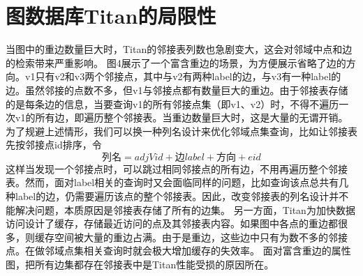 \section{图数据库Titan的局限性}
当图中的重边数量巨大时，Titan的邻接表列数也急剧变大，这会对邻域中点和边的检索带来严重影响。
图4展示了一个富含重边的场景，为方便展示省略了边的方向。v1只有v2和v3两个邻接点，其中与v2有两种label的边，与v3有一种label的边。虽然邻接的点数不多，但v1与邻接点都有数量巨大的重边。由于邻接表存储的是每条边的信息，当要查询v1的所有邻接点集（即v1、v2）时，不得不遍历一次v1的所有边，即遍历整个邻接表。当重边数量巨大时，这是大量的无谓开销。
为了规避上述情形，我们可以换一种列名设计来优化邻域点集查询，比如让邻接表先按邻接点id排序，令
$$列名 = adjVid + 边label + 方向 + eid$$
这样当发现一个邻接点时，可以跳过相同邻接点的所有边，不用再遍历整个邻接表。然而，面对label相关的查询时又会面临同样的问题，比如查询该点总共有几种label的边，仍需要遍历该点的整个邻接表。因此，改变邻接表的列名设计并不能解决问题，本质原因是邻接表存储了所有的边集。
另一方面，Titan为加快数据访问设计了缓存，存储最近访问的点及其邻接表内容。如果图中各点的重边都很多，则缓存空间被大量的重边占满。由于是重边，这些边中只有为数不多的邻接点。在做邻域点集相关查询时就会极大增加缓存的失效率。
面对富含重边的属性图，把所有边集都存在邻接表中是Titan性能受损的原因所在。



